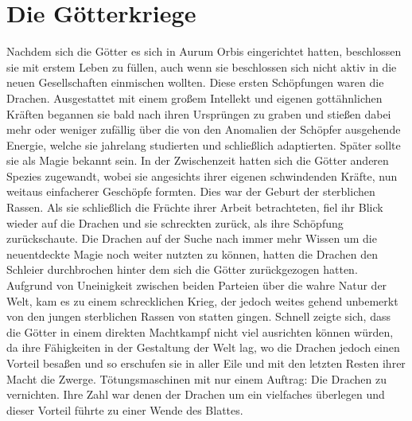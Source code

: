 \documentclass[a4paper,12pt,oneside]{book}
\begin{document}
\section{Die Götterkriege}
Nachdem sich die Götter es sich in Aurum Orbis eingerichtet hatten, beschlossen sie mit erstem Leben zu füllen, auch wenn sie beschlossen sich nicht aktiv in die neuen Gesellschaften einmischen wollten. Diese ersten Schöpfungen waren die Drachen. Ausgestattet mit einem großem Intellekt und eigenen gottähnlichen Kräften begannen sie bald nach ihren Ursprüngen zu graben und stießen dabei mehr oder weniger zufällig über die von den Anomalien der Schöpfer ausgehende Energie, welche sie jahrelang studierten und schließlich adaptierten. Später sollte sie als Magie bekannt sein. In der Zwischenzeit hatten sich die Götter anderen Spezies zugewandt, wobei sie angesichts ihrer eigenen schwindenden Kräfte, nun weitaus einfacherer Geschöpfe formten. Dies war der Geburt der sterblichen Rassen. Als sie schließlich die Früchte ihrer Arbeit betrachteten, fiel ihr Blick wieder auf die Drachen und sie schreckten zurück, als ihre Schöpfung zurückschaute. Die Drachen auf der Suche nach immer mehr Wissen um die neuentdeckte Magie noch weiter nutzten zu können, hatten die Drachen den Schleier durchbrochen hinter dem sich die Götter zurückgezogen hatten. Aufgrund von Uneinigkeit zwischen beiden Parteien über die wahre Natur der Welt, kam es zu einem schrecklichen Krieg, der jedoch weites gehend unbemerkt von den jungen sterblichen Rassen von statten gingen. Schnell zeigte sich, dass die Götter in einem direkten Machtkampf nicht viel ausrichten können würden, da ihre Fähigkeiten in der Gestaltung der Welt lag, wo die Drachen jedoch einen Vorteil besaßen und so erschufen sie in aller Eile und mit den letzten Resten ihrer Macht die Zwerge. Tötungsmaschinen mit nur einem Auftrag: Die Drachen zu vernichten. Ihre Zahl war denen der Drachen um ein vielfaches überlegen und dieser Vorteil führte zu einer Wende des Blattes. 
\end{document}
